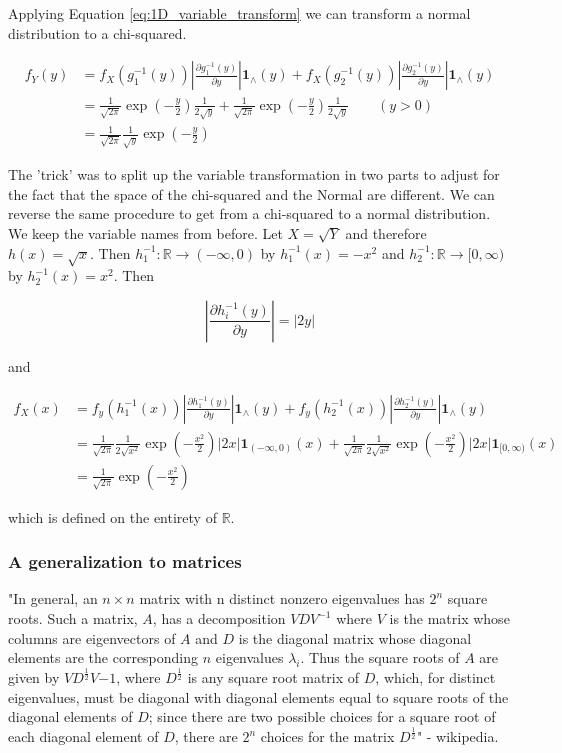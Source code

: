 Applying Equation \ref{eq:1D_variable_transform} we can transform a normal distribution to a chi-squared.

\begin{align}
	f_Y(y) &= f_X(g_1^{-1}(y))	\left\vert\frac{\partial g_1^{-1}(y)}{\partial y} \right\vert \mathbf{1}_\wedge(y) + f_X(g_2^{-1}(y))	\left\vert\frac{\partial g_2^{-1}(y)}{\partial y} \right\vert \mathbf{1}_\wedge(y) \nonumber\\
	&= \frac{1}{\sqrt{2\pi}} \exp(-\frac{y}{2}) \frac{1}{2\sqrt{y}} + \frac{1}{\sqrt{2\pi}} \exp(-\frac{y}{2}) \frac{1}{2\sqrt{y}} \qquad(y > 0)\\
	&= \frac{1}{\sqrt{2\pi}} \frac{1}{\sqrt{y}}\exp(-\frac{y}{2}) \nonumber
\end{align}

The 'trick' was to split up the variable transformation in two parts to adjust for the fact that the space of the chi-squared and the Normal are different. We can reverse the same procedure to get from a chi-squared to a normal distribution. We keep the variable names from before. Let $X = \sqrt{Y}$ and therefore $h(x) = \sqrt{x}$. Then $h_1^{-1}: \mathbb{R} \rightarrow (-\infty, 0)$ by $h_1^{-1}(x) = -x^2$ and $h_2^{-1}: \mathbb{R} \rightarrow [0, \infty)$ by $h_2^{-1}(x) = x^2$. Then

$$\left\vert\frac{\partial h_i^{-1}(y)}{\partial y} \right\vert = \vert 2y \vert $$

and
 
\begin{align}
	f_X(x) &= f_y(h_1^{-1}(x)) \left\vert\frac{\partial h_1^{-1}(y)}{\partial y} \right\vert \mathbf{1}_\wedge(y) + f_y(h_2^{-1}(x)) \left\vert\frac{\partial h_2^{-1}(y)}{\partial y} \right\vert \mathbf{1}_\wedge(y) \nonumber \\
	&= \frac{1}{\sqrt{2\pi}} \frac{1}{2\sqrt{x^2}} \exp(-\frac{x^2}{2}) |2x| \mathbf{1}_{(-\infty, 0)}(x) + \frac{1}{\sqrt{2\pi}} \frac{1}{2\sqrt{x^2}} \exp(-\frac{x^2}{2}) |2x| \mathbf{1}_{[0, \infty)}(x) \\
	&= \frac{1}{\sqrt{2\pi}} \exp(-\frac{x^2}{2}) \nonumber
\end{align}

which is defined on the entirety of $\mathbb{R}$.

\subsubsection{A generalization to matrices}

"In general, an $n\times n$ matrix with n distinct nonzero eigenvalues has $2^n$ square roots. Such a matrix, $A$, has a decomposition $VDV^{-1}$ where $V$ is the matrix whose columns are eigenvectors of $A$ and $D$ is the diagonal matrix whose diagonal elements are the corresponding $n$ eigenvalues $\lambda_i$. Thus the square roots of $A$ are given by $VD^{\frac{1}{2}} V{-1}$, where $D^\frac{1}{2}$ is any square root matrix of $D$, which, for distinct eigenvalues, must be diagonal with diagonal elements equal to square roots of the diagonal elements of $D$; since there are two possible choices for a square root of each diagonal element of $D$, there are $2^n$ choices for the matrix $D^{\frac{1}{2}}$" - wikipedia. 

